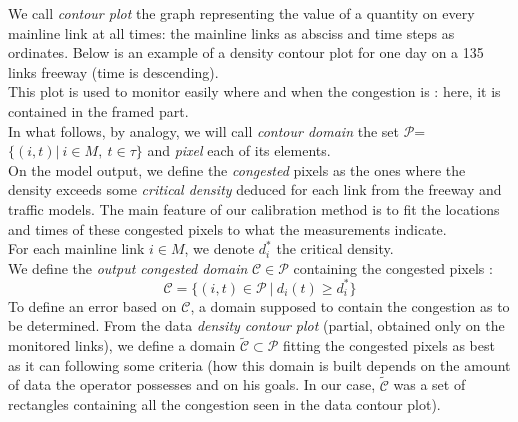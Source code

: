 We call \emph{contour plot} the graph representing the value of a quantity on every mainline link at all times: the mainline links as absciss and time steps as ordinates.
Below is an example of a density contour plot for one day on a 135 links freeway (time is descending).\\
This plot is used to monitor easily where and when the congestion is : here, it is contained in the framed part.\\
In what follows, by analogy, we will call \emph{contour domain} the set $\mathscr{P}$=$\big\{(i,t)|\ i\in M,\ t\in\tau\big\}$ and \emph{pixel} each of its elements.\\
On the model output, we define the \emph{congested} pixels as the ones where the density exceeds some \emph{critical density} deduced for each link from the freeway and traffic models. The main feature of our calibration method is to fit the locations and times of these congested pixels to what the measurements indicate.\\
For each mainline link $i\in{M}$, we denote $d_{i}^{*}$ the critical density.
\\
We define the \emph{output congested domain} $\mathscr{C}\in\mathscr{P}$ containing the congested pixels :
\begin{equation*}
	\mathscr{C}=\big\{ (i,t)\in{\mathscr{P}}\ |\ {d_{i}(t) \geq d_{i}^{*}}\big\}
\end{equation*}
To define an error based on $\mathscr{C}$, a domain supposed to contain the congestion as to be determined.
From the data \emph{density contour plot} (partial, obtained only on the monitored links), we define a domain $\widetilde{\mathscr{C}}\subset\mathscr{P}$ fitting the congested pixels as best as it can following some criteria (how this domain is built depends on the amount of data the operator possesses and on his goals. In our case, $\widetilde{\mathscr{C}}$ was a set of rectangles containing all the congestion seen in the data contour plot).\\
